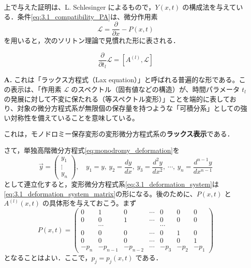 上で与えた証明は、L. Schlesinger によるもので，$Y(x,t)$ の構成法を与えている．条件\eqref{eq:3.1_compatibility_PA}は、微分作用素
\[
  \mathcal{L} = \frac{\partial}{\partial x} - P(x,t)
\]
を用いると，次のソリトン理論で見慣れた形に表される．

\begin{equation}\label{eq:3.1_lax_equation}
  \frac{\partial}{\partial t_l}\mathcal{L} = [A^{(l)}, \mathcal{L}]
\end{equation}

\begin{Q}[微分作用素 $\mathcal{L}$ を用いて完全積分可能条件を $\frac{\partial \mathcal{L}}{\partial t_l} = {[}A^{(l)}, \mathcal{L}{]}$ と書くことの本質的な意義は何か？]
\textbf{A.} これは「ラックス方程式（Lax equation）」と呼ばれる普遍的な形である。この表示は、「作用素 $\mathcal{L}$ のスペクトル（固有値などの構造）が、時間パラメータ $t_l$ の発展に対して不変に保たれる（等スペクトル変形）」ことを端的に表しており、対象の微分方程式系が無限個の保存量を持つような「可積分系」としての強い対称性を備えていることを意味している。
\end{Q}

これは，モノドロミー保存変形の変形微分方程式系の\textbf{ラックス表示}である．

さて，単独高階微分方程式\eqref{eq:monodromy_deformation}を
\[
  \vec{y} = \begin{pmatrix} y_1 \\ \vdots \\ y_n \end{pmatrix}, \quad
  y_1 = y, \ y_2 = \frac{dy}{dx}, \ y_3 = \frac{d^2 y}{dx^2}, \ \cdots, \ y_n = \frac{d^{n-1}y}{dx^{n-1}}
\]
として連立化すると，変形微分方程式系\eqref{eq:3.1_deformation_system}は\eqref{eq:3.1_deformation_system_matrix}の形になる。後のために、$P(x,t)$ と $A^{(l)}(x,t)$ の具体形を与えておこう。まず
\begin{equation}\label{eq:3.1_matrix_P}
  P(x,t) =
  \begin{pmatrix}
    0 & 1 & 0 & \cdots & 0 & 0 & 0 \\
    0 & 0 & 1 & \cdots & 0 & 0 & 0 \\
      & \cdots &   &        & \cdots &   &   \\
    0 & 0 & 0 & \cdots & 0 & 1 & 0 \\
    0 & 0 & 0 & \cdots & 0 & 0 & 1 \\
    -p_n & -p_{n-1} & -p_{n-2} & \cdots & -p_3 & -p_2 & -p_1
  \end{pmatrix}
\end{equation}
となることはよい．ここで，$p_j=p_j(x,t)$ である．

